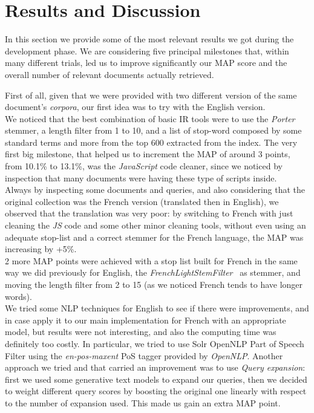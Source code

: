 \pagebreak
\section{Results and Discussion}

\label{sec:results}


In this section we provide some of the most relevant results we got during the development phase.
We are considering five principal milestones that, within many different trials, led us to improve significantly our \ac{MAP} score and the overall number of relevant documents actually retrieved.

First of all, given that we were provided with two different version of the same document's \textit{corpora}, our first idea was to try with the English version.\\ 
We noticed that the best combination of basic \ac{IR} tools were to use the \textit{Porter} stemmer, a length filter from 1 to 10, and a list of stop-word composed by some standard terms and more from the top 600 extracted from the index.
The very first big milestone, that helped us to increment the \ac{MAP} of around 3 points, from 10.1\% to 13.1\%, was the \textit{JavaScript} code cleaner, since we noticed by inspection that many documents were having these type of scripts inside.\\
Always by inspecting some documents and queries, and also considering that the original collection was the French version (translated then in English), we observed that the translation was very poor: by switching to French
with just cleaning the \textit{JS} code and some other minor cleaning tools, without even using an adequate stop-list and a correct stemmer for the French language, the \ac{MAP} was increasing by +5\%. \\
2 more \ac{MAP} points were achieved with a stop list built for French in the same way we did previously for English, the \textit{FrenchLightStemFilter}~\cite{solrfrenchlightstemfilter} as stemmer, and moving the length filter from 2 to 15 (as we noticed French tends to have longer words). \\
We tried some \ac{NLP} techniques for English to see if there were improvements, and in case apply it to our main implementation for French with an appropriate model, but results
were not interesting, and also the computing time was definitely too costly. In particular, we tried to use Solr OpenNLP Part of Speech Filter \cite{solropennlpposfilter} using the \textit{en-pos-maxent} \ac{PoS} tagger provided by \textit{OpenNLP}. 
Another approach we tried and that carried an improvement was to use \textit{Query expansion}: first we used some generative text models to expand our queries, then we decided to weight different query scores by boosting the original one linearly with respect to the number
of expansion used. This made us gain an extra \ac{MAP} point.

